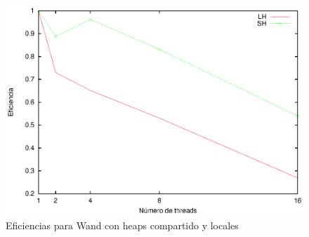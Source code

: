 \begin{figure}[!ht]
\centering
\includegraphics[scale=.75]{images/eficiencias_wand.eps}
\caption{Eficiencias para Wand con heaps compartido y locales}
\label{fig:eficiencias_wand}
\end{figure}












